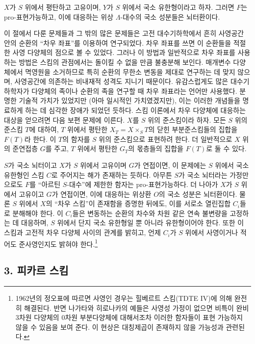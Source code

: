  $X$가 $S$ 위에서 평탄하고 고유이며, $Y$가 $S$
위에서 국소 유한형이라고 하자. 그러면 $F$는 pro-표현가능하고, 이에
대응하는 위상 $\Lambda$-대수의 국소 성분들은 뇌터환이다.

 이 절에서 다룬 문제들과 그 밖의 많은 문제들은 고전
대수기하학에서 흔히 사영공간 안의 순환의 ``차우 좌표''를 이용하여
연구되었다. 차우 좌표를 쓰면 이 순환들을 적절한 사영 다양체의 점으로
볼 수 있었다. 그러나 이 방법과 일반적으로 차우 좌표를 사용하는 방법은
스킴의 관점에서는 돌이킬 수 없을 만큼 불충분해 보인다. 매개변수
다양체에서 멱영원을 소거하므로 특히 순환의 무한소 변동을 제대로
연구하는 데 맞지 않으며, 사영공간에 의존하는 비내재적 성격도 지니기
때문이다. 유감스럽게도 많은 대수기하학자가 다양체의 족이나 순환의 족을
연구할 때 차우 좌표라는 언어만 사용했다. 분명한 기술적 가치가 있었지만
(아마 일시적인 가치였겠지만), 이는 이러한 개념들을 명료하게 하는 데
심각한 장애가 되었던 듯하다. 스킴 이론에서 차우 다양체에 대응하는
대상을 얻으려면 다음 보편 문제에 이른다. $X$를 $S$ 위의 준스킴이라
하자. 모든 $S$ 위의 준스킴 $T$에 대하여, $T$ 위에서 평탄한
$X_T=X\times_ST$의 닫힌 부분준스킴들의 집합을 $F(T)$라 한다. 이
$T$의 함자를 $S$ 위의 준스킴으로 표현하려 한다. 더 일반적으로 $X$ 위의
준연접층 $G$를 주고, $T$ 위에서 평탄한 $G_T$의 몫층들의 집합을
$F(T)$로 둘 수 있다.

$S$가 국소 뇌터이고 $X$가 $S$ 위에서 고유이며 $G$가 연접이면, 이
문제에는 $S$ 위에서 국소 유한형인 스킴 $C$로 주어지는 해가 존재하는
듯하다. 아무튼 $S$가 국소 뇌터라는 가정만으로도 $F$를 ``아르틴
$S$-대수''에 제한한 함자는 pro-표현가능하다. 더 나아가 $X$가 $S$
위에서 고유이고 $G$가 연접이면, 이에 대응하는 위상환 $O$의 국소 성분은
뇌터환이다. 물론 $S$ 위에서 $X$의 ``차우 스킴''이 존재함을 증명한
뒤에도, 이를 서로소 열린집합 $C_i$들로 분해해야 한다. 이 $C_i$들은
변동하는 순환의 차수와 차원 같은 연속 불변량을 고정하는 데 대응하며,
$S$ 위에서 단지 국소 유한형일 뿐 아니라 유한형이어야 한다. 또한 이
스킴과 고전적 차우 다양체 사이의 관계를 밝히고, 언제 $C_i$가 $S$ 위에서
사영이거나 적어도 준사영인지도 밝혀야 한다.\footnote{1962년의 정오표에
따르면 사영인 경우는 힐베르트 스킴(TDTE IV)에 의해 완전히 해결된다.
반면 나가타와 히로나카의 예들은 사영성 가정이 없으면 비특이 완비
3차원 다양체의 0차원 부분다양체에 대해서조차 이러한 함자들이 표현
가능하지 않을 수 있음을 보여 준다. 이 현상은 대칭제곱이 존재하지 않을
가능성과 관련된다.}
\subsection*{3. 피카르 스킴}

